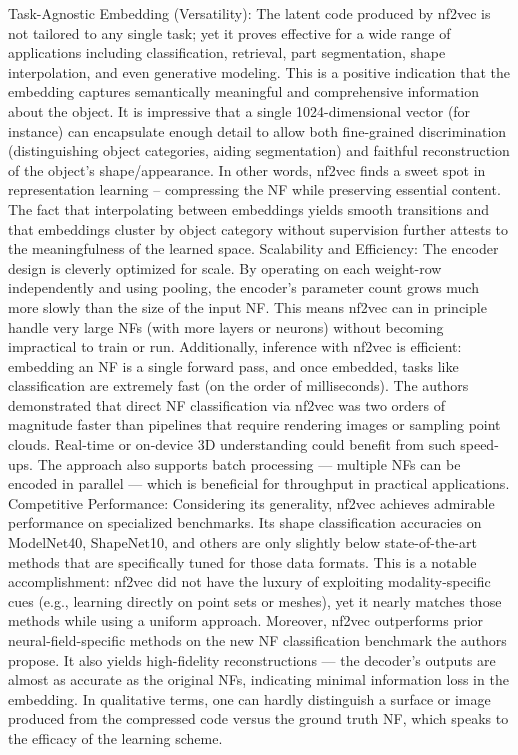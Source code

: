 \documentclass[11pt]{article}
\begin{document}
Task-Agnostic Embedding (Versatility): The latent code produced by nf2vec is not tailored to any single task; yet it proves effective for a wide range of applications including classification, retrieval, part segmentation, shape interpolation, and even generative modeling. This is a positive indication that the embedding captures semantically meaningful and comprehensive information about the object. It is impressive that a single 1024-dimensional vector (for instance) can encapsulate enough detail to allow both fine-grained discrimination (distinguishing object categories, aiding segmentation) and faithful reconstruction of the object’s shape/appearance. In other words, nf2vec finds a sweet spot in representation learning – compressing the NF while preserving essential content. The fact that interpolating between embeddings yields smooth transitions and that embeddings cluster by object category without supervision further attests to the meaningfulness of the learned space.
Scalability and Efficiency: The encoder design is cleverly optimized for scale. By operating on each weight-row independently and using pooling, the encoder’s parameter count grows much more slowly than the size of the input NF. This means nf2vec can in principle handle very large NFs (with more layers or neurons) without becoming impractical to train or run. Additionally, inference with nf2vec is efficient: embedding an NF is a single forward pass, and once embedded, tasks like classification are extremely fast (on the order of milliseconds). The authors demonstrated that direct NF classification via nf2vec was two orders of magnitude faster than pipelines that require rendering images or sampling point clouds. Real-time or on-device 3D understanding could benefit from such speed-ups. The approach also supports batch processing — multiple NFs can be encoded in parallel — which is beneficial for throughput in practical applications.
Competitive Performance: Considering its generality, nf2vec achieves admirable performance on specialized benchmarks. Its shape classification accuracies on ModelNet40, ShapeNet10, and others are only slightly below state-of-the-art methods that are specifically tuned for those data formats. This is a notable accomplishment: nf2vec did not have the luxury of exploiting modality-specific cues (e.g., learning directly on point sets or meshes), yet it nearly matches those methods while using a uniform approach. Moreover, nf2vec outperforms prior neural-field-specific methods on the new NF classification benchmark the authors propose. It also yields high-fidelity reconstructions — the decoder’s outputs are almost as accurate as the original NFs, indicating minimal information loss in the embedding. In qualitative terms, one can hardly distinguish a surface or image produced from the compressed code versus the ground truth NF, which speaks to the efficacy of the learning scheme.
\end{document}
